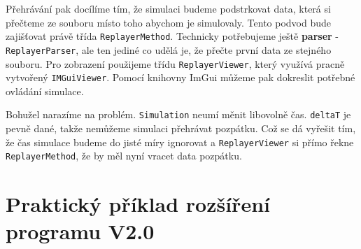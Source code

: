 Přehrávání pak docílíme tím, že simulaci budeme podstrkovat data, která si přečteme ze souboru místo toho abychom je simulovaly. Tento podvod bude zajišťovat právě třída \texttt{ReplayerMethod}. Technicky potřebujeme ještě \textbf{parser} - \texttt{ReplayerParser}, ale ten jediné co udělá je, že přečte první data ze stejného souboru. Pro zobrazení použijeme třídu \texttt{ReplayerViewer}, který využívá pracně vytvořený \texttt{IMGuiViewer}. Pomocí knihovny ImGui můžeme pak dokreslit potřebné ovládání simulace.

Bohužel narazíme na problém. \texttt{Simulation} neumí měnit libovolně čas. \texttt{deltaT} je pevně dané, takže nemůžeme simulaci přehrávat pozpátku. Což se dá vyřešit tím, že čas simulace budeme do jisté míry ignorovat a \texttt{ReplayerViewer} si přímo řekne \texttt{ReplayerMethod}, že by měl nyní vracet data pozpátku.
\section{Praktický příklad rozšíření programu V2.0}
\label{sec:extV2}